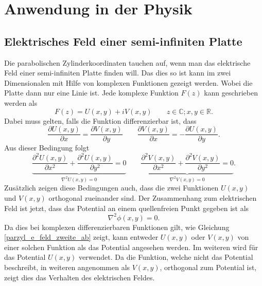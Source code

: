 %
%
%
\section{Anwendung in der Physik 
\label{parzyl:section:teil2}}


\subsection{Elektrisches Feld einer semi-infiniten Platte
\label{parzyl:subsection:bonorum}}
Die parabolischen Zylinderkoordinaten tauchen auf, wenn man das elektrische Feld einer semi-infiniten Platte finden will.
Das dies so ist kann im zwei Dimensionalen mit Hilfe von komplexen Funktionen gezeigt werden. Wobei die Platte dann nur eine Linie ist.
Jede komplexe Funktion $F(z)$ kann geschrieben werden als
\begin{equation}
	F(z) = U(x,y) + iV(x,y) \qquad z \in \mathbb{C}; x,y \in \mathbb{R}.
\end{equation}  
Dabei muss gelten, falls die Funktion differenzierbar ist, dass
\begin{equation}
	\frac{\partial U(x,y)}{\partial x} 
	=
	\frac{\partial V(x,y)}{\partial y} 
	\qquad
	\frac{\partial V(x,y)}{\partial x}
	=
	-\frac{\partial U(x,y)}{\partial y}.
\end{equation}
Aus dieser Bedingung folgt 
\begin{equation}
	\label{parzyl_e_feld_zweite_ab}
	\underbrace{
	\frac{\partial^2 U(x,y)}{\partial x^2}
	+ 
	\frac{\partial^2 U(x,y)}{\partial y^2}
	=
	0
	}_{\nabla^2U(x,y)=0}
	\qquad
	\underbrace{
	\frac{\partial^2 V(x,y)}{\partial x^2}
	+
	\frac{\partial^2 V(x,y)}{\partial y^2}
	=
	0
	}_{\nabla^2V(x,y) = 0}.
\end{equation}
Zusätzlich zeigen diese Bedingungen auch, dass die zwei Funktionen $U(x,y)$ und $V(x,y)$ orthogonal zueinander sind.
Der Zusammenhang zum elektrischen Feld ist jetzt, dass das Potential an einem quellenfreien Punkt gegeben ist als 
\begin{equation}
	\nabla^2\phi(x,y) = 0.
\end{equation}
Da dies bei komplexen differenzierbaren Funktionen gilt, wie Gleichung \ref{parzyl_e_feld_zweite_ab} zeigt, kann entweder $U(x,y)$ oder $V(x,y)$ von einer solchen Funktion als das Potential angesehen werden. Im weiteren wird für das Potential $U(x,y)$ verwendet.  
Da die Funktion, welche nicht das Potential beschreibt, in weiteren angenommen als $V(x,y)$, orthogonal zum Potential ist, zeigt dies das Verhalten des elektrischen Feldes.
